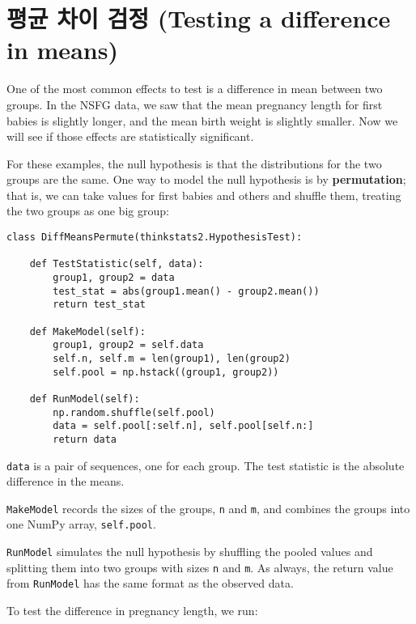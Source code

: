 \section{평균 차이 검정 (Testing a difference in means)}
\label{testdiff}

One of the most common effects to test is a difference in mean
between two groups.  In the NSFG data, we saw that the mean pregnancy
length for first babies is slightly longer, and the mean birth weight
is slightly smaller.  Now we will see if those effects are
statistically significant.

For these examples, the null hypothesis is that the distributions
for the two groups are the same.  One way to model the null
hypothesis is by {\bf permutation}; that is, we can take values
for first babies and others and shuffle them, treating
the two groups as one big group:

\begin{verbatim}
class DiffMeansPermute(thinkstats2.HypothesisTest):

    def TestStatistic(self, data):
        group1, group2 = data
        test_stat = abs(group1.mean() - group2.mean())
        return test_stat

    def MakeModel(self):
        group1, group2 = self.data
        self.n, self.m = len(group1), len(group2)
        self.pool = np.hstack((group1, group2))

    def RunModel(self):
        np.random.shuffle(self.pool)
        data = self.pool[:self.n], self.pool[self.n:]
        return data
\end{verbatim}

{\tt data} is a pair of sequences, one for each
group.  The test statistic is the absolute difference in the means.

{\tt MakeModel} records the sizes of the groups, {\tt n} and
{\tt m}, and combines the groups into one NumPy
array, {\tt self.pool}.

{\tt RunModel} simulates the null hypothesis by shuffling the
pooled values and splitting them into two groups with sizes {\tt n}
and {\tt m}.  As always, the return value from {\tt RunModel} has
the same format as the observed data.

To test the difference in pregnancy length, we run:

